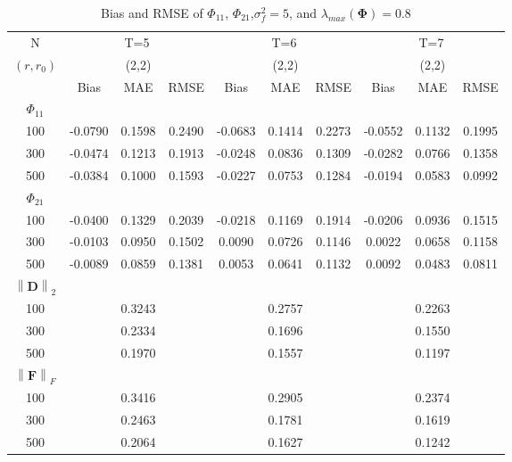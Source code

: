 \documentclass[12pt,a4paper,hyperref]{article}
\begin{document}
\begin{table}[H]
\caption{Bias and RMSE of $\Phi_{11}$, $\Phi_{21}$,$\sigma^{2}_{f}=5$,  and $\lambda_{max}(\boldsymbol{\Phi})=0.8$}
\centering
\tabcolsep=0.11cm
\begin{threeparttable}
\begin{tabular} {*{10}{c}}
\toprule
N& \multicolumn{3}{c}{T=5}&\multicolumn{3}{c}{T=6}&\multicolumn{3}{c}{T=7}\\
\cmidrule(lr){1-10}
$(r,r_{0})$ &   &(2,2)  &  &   &(2,2)  & &  &(2,2) & \\
\cmidrule(lr){1-4} \cmidrule(lr){5-7}\cmidrule(lr){8-10}
& \multicolumn{1}{c}{Bias} &\multicolumn{1}{c}{MAE}& \multicolumn{1}{c}{RMSE}&\multicolumn{1}{c}{Bias} &\multicolumn{1}{c}{MAE}& \multicolumn{1}{c}{RMSE}&\multicolumn{1}{c}{Bias}&\multicolumn{1}{c}{MAE} & \multicolumn{1}{c}{RMSE}\\
  \cmidrule(lr){2-4} \cmidrule(lr){5-7} \cmidrule(lr){8-10}
 $\Phi_{11}$\\
\cmidrule(lr){1-10}
 100&-0.0790 & 0.1598&0.2490&-0.0683  &0.1414&0.2273 &-0.0552&0.1132& 0.1995\\
300& -0.0474&0.1213 & 0.1913& -0.0248 & 0.0836&0.1309 &-0.0282 &0.0766&0.1358\\
500&-0.0384& 0.1000&0.1593 & -0.0227 &0.0753 &0.1284 &-0.0194 &0.0583&0.0992 \\
\cmidrule(lr){1-10}
$\Phi_{21}$\\
\cmidrule(lr){1-4}   \cmidrule(lr){5-7}   \cmidrule(lr){8-10}
100&-0.0400 & 0.1329& 0.2039& -0.0218& 0.1169& 0.1914& -0.0206& 0.0936&0.1515 \\
300&-0.0103 & 0.0950&0.1502 & 0.0090 &0.0726 &0.1146 &0.0022 & 0.0658&0.1158\\
500&-0.0089 & 0.0859& 0.1381& 0.0053 &0.0641 &0.1132 &0.0092 & 0.0483&0.0811 \\
\cmidrule(lr){1-10}
$\left\| \boldsymbol{D} \right\|_{2} $\\
\cmidrule(lr){1-4}   \cmidrule(lr){5-7}   \cmidrule(lr){8-10}
100& &0.3243& &  &0.2757 & & & 0.2263& \\
300& & 0.2334& &  &0.1696 & & &0.1550 &\\
500& & 0.1970& &  &0.1557 & & &0.1197 & \\
\cmidrule(lr){1-10}
$\left\| \boldsymbol{F} \right\|_{F} $\\
\cmidrule(lr){1-4}   \cmidrule(lr){5-7}   \cmidrule(lr){8-10}
100& &0.3416 & &  &0.2905 & & &0.2374 & \\
300& &0.2463 & &  & 0.1781& & & 0.1619&\\
500& & 0.2064& &  &0.1627 & & & 0.1242& \\
\bottomrule
\end{tabular}


\end{threeparttable}
\end{table}
\end{document}
